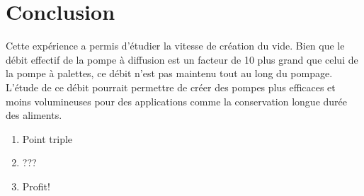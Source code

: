 \section{Conclusion}

Cette expérience a permis d'étudier la vitesse de création du vide. Bien que le débit effectif de la pompe à diffusion est un facteur de 10 plus grand que celui de la pompe à palettes, ce débit n'est pas maintenu tout au long du pompage. L'étude de ce débit pourrait permettre de créer des pompes plus efficaces et moins volumineuses pour des applications comme la conservation longue durée des aliments.

\begin{enumerate}
    \item Point triple
    \item ???
    \item Profit!
\end{enumerate}
